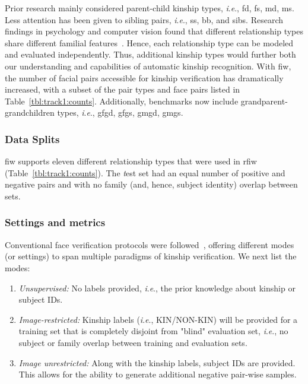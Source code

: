 \documentclass[letterpaper, 10 pt, conference]{ieeeconf}
\newcommand{\ie}{\textit{i}.\textit{e}., }
\begin{document}
 
Prior research mainly considered parent-child kinship types, \ie \ac{fd}, \ac{fs}, \ac{md}, \ac{ms}. Less attention has been given to sibling pairs, \ie \ac{ss}, \ac{bb}, and \ac{sibs}. Research findings in psychology and computer vision found that different relationship types share different familial features~\cite{Ming_CVPR11_Genealogical}. Hence, each relationship type can be modeled and evaluated independently. Thus, additional kinship types would further both our understanding and capabilities of automatic kinship recognition. With \ac{fiw}, the number of facial pairs accessible for kinship verification has dramatically increased, with a subset of the pair types and face pairs listed in Table~\ref{tbl:track1:counts}. Additionally, benchmarks now include grandparent-grandchildren types, \ie \ac{gfgd}, \ac{gfgs}, \ac{gmgd}, \ac{gmgs}.




\subsubsection{Data Splits}
 \ac{fiw} supports eleven different relationship types that were used in \ac{rfiw} (Table~\ref{tbl:track1:counts}). The {\emph test} set had an equal number of positive and negative pairs and with no family (and, hence, subject identity) overlap between sets. 


\subsubsection{Settings and metrics}\label{subsec:track1:settings}
Conventional face verification protocols were followed~\cite{LFWTech}, offering different modes (or settings) to span multiple paradigms of kinship verification. We next list the modes:
\begin{enumerate}
    \item \textit{Unsupervised:} No labels provided, \ie the prior knowledge about kinship or subject IDs.
    \item \textit{Image-restricted:} Kinship labels (\ie KIN/NON-KIN) will be provided for a training set that is completely disjoint from "blind" evaluation set, \ie no subject or family overlap between training and evaluation sets.
    \item \textit{Image unrestricted:} Along with the kinship labels, subject IDs are provided. This allows for the ability to generate additional negative pair-wise samples.
\end{enumerate}
\end{document}
